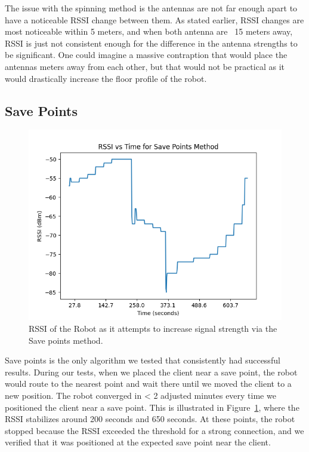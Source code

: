   

The issue with the spinning method is the antennas are not far enough apart to have a noticeable RSSI change between them. As stated earlier, RSSI changes are most noticeable within 5 meters, and when both antenna are ~15 meters away, RSSI is just not consistent enough for the difference in the antenna strengths to be significant. One could imagine a massive contraption that would place the antennas meters away from each other, but that would not be practical as it would drastically increase the floor profile of the robot.

\subsection{Save Points}

\begin{figure}[tp]

\centering

\includegraphics[scale=0.5]{figures/rssi_save_points}

\caption{RSSI of the Robot as it attempts to increase signal strength via the Save points method.}

\label{fig:rssi_save_points}

\end{figure}

Save points is the only algorithm we tested that consistently had successful results. During our tests, when we placed the client near a save point, the robot would route to the nearest point and wait there until we moved the client to a new position. The robot converged in < 2 adjusted minutes every time we positioned the client near a save point. This is illustrated in Figure~\ref{fig:rssi_save_points}, where the RSSI stabilizes around 200 seconds and 650 seconds. At these points, the robot stopped because the RSSI exceeded the threshold for a strong connection, and we verified that it was positioned at the expected save point near the client.

